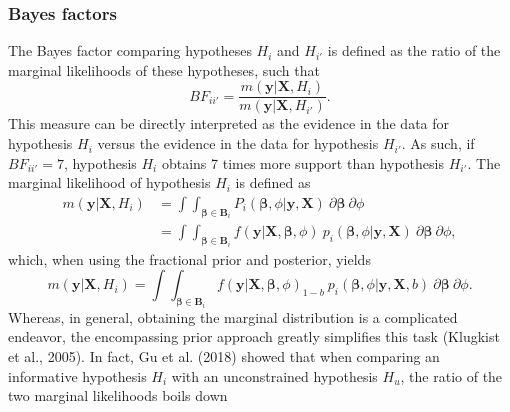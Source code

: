 \documentclass[
]{interact}
\begin{document}
\hypertarget{bayes-factors}{%
\subsubsection{Bayes factors}\label{bayes-factors}}

The Bayes factor comparing hypotheses \(H_i\) and \(H_{i'}\) is defined
as the ratio of the marginal likelihoods of these hypotheses, such that
\[
  BF_{ii'} = \frac{m(\boldsymbol{y} | \boldsymbol{X}, H_i)}{m(\boldsymbol{y} | \boldsymbol{X}, H_{i'})}.
  \] This measure can be directly interpreted as the evidence in the data
for hypothesis \(H_i\) versus the evidence in the data for hypothesis
\(H_{i'}\). As such, if \(BF_{ii'} = 7\), hypothesis \(H_i\) obtains 7
times more support than hypothesis \(H_{i'}\). The marginal likelihood
of hypothesis \(H_i\) is defined as \[
\begin{aligned}
m(\boldsymbol{y} | \boldsymbol{X}, H_i) 
&= \int \int_{\boldsymbol{\beta} \in \boldsymbol{B}_i}  P_i(\boldsymbol{\beta}, \phi | \boldsymbol{y}, \boldsymbol{X}) ~ \partial \boldsymbol{\beta} ~ \partial \phi \\
&= \int \int_{\boldsymbol{\beta} \in \boldsymbol{B}_i} f(\boldsymbol{y} | \boldsymbol{X}, \boldsymbol{\beta}, \phi) ~ p_i(\boldsymbol{\beta}, \phi | \boldsymbol{y}, \boldsymbol{X}) ~ \partial \boldsymbol{\beta} ~ \partial \phi,
\end{aligned}
\] which, when using the fractional prior and posterior, yields \[
m(\boldsymbol{y} | \boldsymbol{X}, H_i) = 
  \int \int_{\boldsymbol{\beta} \in \boldsymbol{B}_i}  
  f(\boldsymbol{y} | \boldsymbol{X}, \boldsymbol{\beta}, \phi)_{1-b} ~ 
  p_i(\boldsymbol{\beta}, \phi | \boldsymbol{y}, \boldsymbol{X}, b) ~ \partial \boldsymbol{\beta} ~ \partial \phi.
\] Whereas, in general, obtaining the marginal distribution is a
complicated endeavor, the encompassing prior approach greatly simplifies
this task (Klugkist et al., 2005). In fact, Gu et al. (2018) showed that
when comparing an informative hypothesis \(H_i\) with an unconstrained
hypothesis \(H_u\), the ratio of the two marginal likelihoods boils down
\end{document}
